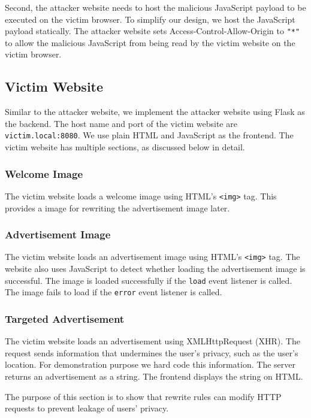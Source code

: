 \documentclass[conference]{IEEEtran}
\begin{document}
Second, the attacker website needs to host the malicious JavaScript payload to be executed on the victim browser. To simplify our design, we host the JavaScript payload statically. The attacker website sets Access-Control-Allow-Origin to \lstinline{"*"} to allow the malicious JavaScript from being read by the victim website on the victim browser.

\subsection{Victim Website}

Similar to the attacker website, we implement the attacker website using Flask as the backend. The host name and port of the victim website are \lstinline{victim.local:8080}. We use plain HTML and JavaScript as the frontend. The victim website has multiple sections, as discussed below in detail.

\subsubsection{Welcome Image}

The victim website loads a welcome image using HTML's \lstinline{<img>} tag. This provides a image for rewriting the advertisement image later.

\subsubsection{Advertisement Image}

The victim website loads an advertisement image using HTML's \lstinline{<img>} tag. The website also uses JavaScript to detect whether loading the advertisement image is successful. The image is loaded successfully if the \lstinline{load} event listener is called. The image fails to load if the \lstinline{error} event listener is called.

\subsubsection{Targeted Advertisement}

The victim website loads an advertisement using XMLHttpRequest (XHR). The request sends information that undermines the user's privacy, such as the user's location. For demonstration purpose we hard code this information. The server returns an advertisement as a string. The frontend displays the string on HTML.

The purpose of this section is to show that rewrite rules can modify HTTP requests to prevent leakage of users' privacy.
\end{document}

